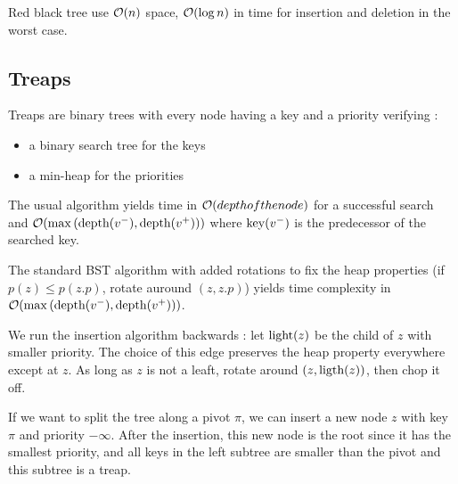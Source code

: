 \documentclass{cours}
\begin{document}
\begin{proposition}[Complexity]
    Red black tree use $\mathcal{O}(n)$ space, $\mathcal{O}(\log n)$ in time for insertion and deletion in the worst case. %
\end{proposition}

\subsection{Treaps}
\begin{definition}
    Treaps are binary trees with every node having a key and a priority verifying :
    \begin{itemize}
        \item a binary search tree for the keys
        \item a min-heap for the priorities
    \end{itemize}
\end{definition}

\begin{proposition}[Search]
    The usual algorithm yields time in $\mathcal{O}(depth of the node)$ for a successful search and $\mathcal{O}(\max \left(\textmd{depth}(v^{-}), \textmd{depth}(v^{+})\right))$ where $\textmd{key}(v^{-})$ is the predecessor of the searched key.
\end{proposition}

\begin{proposition}[Insertion]
    The standard BST algorithm with added rotations to fix the heap properties (if $p(z) \leq p(z.p)$, rotate auround $(z, z.p)$) yields time complexity in $\mathcal{O}(\max\left(\textmd{depth}(v^{-}), \textmd{depth}(v^{+})\right))$.
\end{proposition}

\begin{proposition}[Deletion]
    We run the insertion algorithm backwards : let $\textmd{light}(z)$ be the child of $z$ with smaller priority. The choice of this edge preserves the heap property everywhere except at $z$. As long as $z$ is not a leaft, rotate around $(z, \textmd{ligth}(z))$, then chop it off.
\end{proposition}

\begin{proposition}[Split]
    If we want to split the tree along a pivot $\pi$, we can insert a new node $z$ with key $\pi$ and priority $-\infty$. After the insertion, this new node is the root since it has the smallest priority, and all keys in the left subtree are smaller than the pivot and this subtree is a treap.
\end{proposition}
\end{document}
